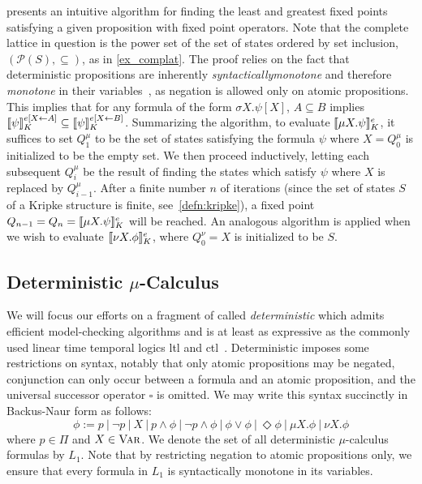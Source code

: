  presents an intuitive algorithm for finding the least and greatest fixed points satisfying a given \mucalc{} proposition with fixed point operators. Note that the complete lattice in question is the power set of the set of states ordered by set inclusion, ${(\mathcal{P}(S), \subseteq)}$, as in \autoref{ex_complat}. The proof relies on the fact that deterministic \mucalc{} propositions are inherently {\em syntactically\/monotone} and therefore {\em monotone\/} in their variables~\cite{Gurfinkel2004}, as negation is allowed only on atomic propositions. This implies that for any formula of the form $\sigma X.\psi[X]$, $A \subseteq B$ implies ${\llbracket}{} \psi {\rrbracket}{}_K^{e[X \leftarrow A]} \subseteq {\llbracket}{} \psi {\rrbracket}{}_K^{e[X \leftarrow B]}$. Summarizing the algorithm, to evaluate ${\llbracket}{} \mu X.\psi {\rrbracket}{}_K^e$, it suffices to set $Q_1^\mu$ to be the set of states satisfying the formula $\psi$ where $X = Q_0^\mu$ is initialized to be the empty set. We then proceed inductively, letting each subsequent $Q_i^\mu$ be the result of finding the states which satisfy $\psi$ where $X$ is replaced by $Q_{i-1}^\mu$. After a finite number $n$ of iterations (since the set of states $S$ of a Kripke structure is finite, see~\autoref{defn:kripke}), a fixed point $Q_{n-1} = Q_n = {\llbracket}{} \mu X.\psi {\rrbracket}{}_K^e$ will be reached. An analogous algorithm is applied when we wish to evaluate ${\llbracket}{} \nu X.\phi {\rrbracket}{}_K^e$, where $Q_0^\nu = X$ is initialized to be $S$.



\subsection{\texorpdfstring{Deterministic $\mu$-Calculus}{Deterministic mu-Calculus}}\label{sec:determinitic_mucalc}

We will focus our efforts on a fragment of \mucalc{} called {\em deterministic\/\mucalc{}\/} which admits efficient model-checking algorithms and is at least as expressive as the commonly used linear time temporal logics \gls{ltl} and \gls{ctl}~\cite{Karaman2009}. Deterministic \mucalc{} imposes some restrictions on syntax, notably that only atomic propositions may be negated, conjunction can only occur between a formula and an atomic proposition, and the universal successor operator $\square$ is omitted. We may write this syntax succinctly in Backus-Naur form as follows:
\[ 
\phi := p \ | \ \lnot p \ | \ X \ | \ p \land \phi \ | \ \lnot p \land \phi \ | \ \phi \lor \phi \ | \ \Diamond \phi \ | \ \mu X.\phi \ | \ \nu X. \phi
\]
where $p \in \Pi$ and $X \in \textsc{Var}$. We denote the set of all deterministic $\mu$-calculus formulas by $L_1$. Note that by restricting negation to atomic propositions only, we ensure that every formula in $L_1$ is syntactically monotone in its variables.


